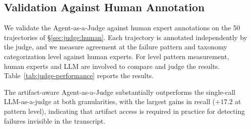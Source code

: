 \subsection{Validation Against Human Annotation}
\label{sec:judge:validation}

We validate the Agent-as-a-Judge against human expert annotations on the 50 %
trajectories of \S\ref{sec:judge:human}.
Each trajectory is annotated independently by the
judge, and we measure agreement at the failure pattern and taxonomy categorization level against human experts. For level pattern measurement, human experts and LLM are involved to compare and judge the results.
Table~\ref{tab:judge-performance} reports the results.

The artifact-aware Agent-as-a-Judge substantially outperforms the single-call LLM-as-a-judge at both granularities, with the largest gains in recall ($+17.2$ at pattern level), indicating that artifact access is required in practice for detecting failures invisible in the transcript.

